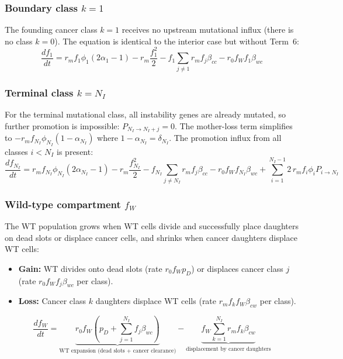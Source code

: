 \documentclass[11pt,a4paper]{article}
\begin{document}
\subsubsection*{Boundary class $k = 1$}

The founding cancer class $k=1$ receives no upstream mutational influx (there is no class $k=0$). The equation is identical to the interior case but without Term~6:
\begin{equation}
    \frac{df_1}{dt} = r_m f_1 \phi_1 (2\alpha_1 - 1) - r_m \frac{f_1^2}{2} - f_1 \sum_{j \neq 1} r_m f_j \beta_{cc} - r_0 f_W f_1 \beta_{wc}
\end{equation}

\subsubsection*{Terminal class $k = N_I$}

For the terminal mutational class, all instability genes are already mutated, so further promotion is impossible: $P_{N_I \to N_I+j} = 0$. The mother-loss term simplifies to $-r_m f_{N_I} \phi_{N_I} (1 - \alpha_{N_I})$ where $1 - \alpha_{N_I} = \delta_{N_I}$. The promotion influx from all classes $i < N_I$ is present:
\begin{equation}
    \frac{df_{N_I}}{dt} = r_m f_{N_I} \phi_{N_I} (2\alpha_{N_I} - 1) - r_m \frac{f_{N_I}^2}{2} - f_{N_I} \sum_{j \neq N_I} r_m f_j \beta_{cc} - r_0 f_W f_{N_I} \beta_{wc} + \sum_{i=1}^{N_I-1} 2\, r_m f_i \phi_i P_{i \to N_I}
\end{equation}

\subsubsection*{Wild-type compartment $f_W$}

The WT population grows when WT cells divide and successfully place daughters on dead slots or displace cancer cells, and shrinks when cancer daughters displace WT cells:

\begin{itemize}
    \item \textbf{Gain:} WT divides onto dead slots (rate $r_0 f_W p_D$) or displaces cancer class $j$ (rate $r_0 f_W f_j \beta_{wc}$ per class).
    \item \textbf{Loss:} Cancer class $k$ daughters displace WT cells (rate $r_m f_k f_W \beta_{cw}$ per class).
\end{itemize}

\begin{equation}
    \frac{df_W}{dt} = \underbrace{r_0 f_W \left( p_D + \sum_{j=1}^{N_I} f_j \beta_{wc} \right)}_{\text{WT expansion (dead slots + cancer clearance)}} - \underbrace{f_W \sum_{k=1}^{N_I} r_m f_k \beta_{cw}}_{\text{displacement by cancer daughters}}
\end{equation}
\end{document}
